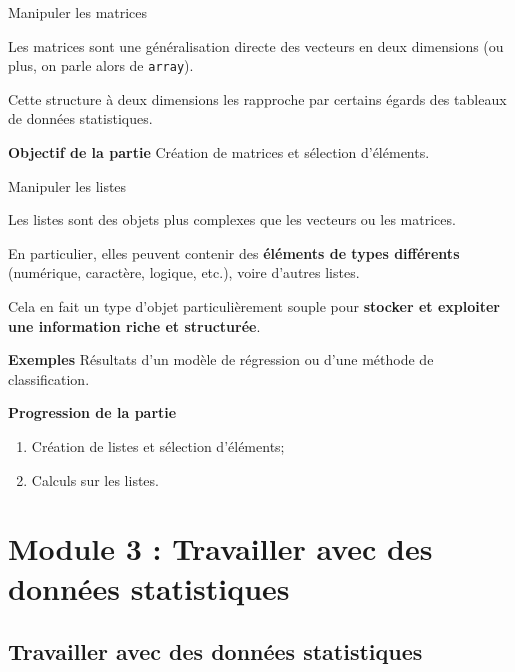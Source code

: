 \documentclass[12pt,ignorenonframetext,]{beamer}
\providecommand{\tightlist}{%
  \setlength{\itemsep}{0pt}\setlength{\parskip}{0pt}}
\newcommand{\aparte}[2]{
	{\small\textsf{\textcolor{redInsee}{\textbf{#1}} #2}}
}
\newcommand{\strong}[1]{\textbf{\textcolor{redInsee}{#1}}}
\begin{document}
\begin{frame}[fragile]{Manipuler les matrices}
\protect\hypertarget{manipuler-les-matrices}{}

Les matrices sont une généralisation directe des vecteurs en deux
dimensions (ou plus, on parle alors de \texttt{array}).

\pause Cette structure à deux dimensions les rapproche par certains
égards des tableaux de données statistiques.

\pause \bigskip \strong{Objectif de la partie} Création de matrices et
sélection d’éléments.

\end{frame}

\begin{frame}{Manipuler les listes}
\protect\hypertarget{manipuler-les-listes}{}

Les listes sont des objets plus complexes que les vecteurs ou les
matrices.

\pause En particulier, elles peuvent contenir des \textbf{éléments de
types différents} (numérique, caractère, logique, etc.), voire d’autres
listes.

\pause Cela en fait un type d’objet particulièrement souple pour
\textbf{stocker et exploiter une information riche et structurée}.

\aparte{Exemples}{Résultats d'un modèle de régression ou d'une méthode de classification.}

\pause \bigskip \strong{Progression de la partie}

\begin{enumerate}
[1.]
\tightlist
\item
  Création de listes et sélection d’éléments;
\item
  Calculs sur les listes.
\end{enumerate}

\end{frame}

\hypertarget{module-3-travailler-avec-des-donnees-statistiques}{%
\section{Module 3 : Travailler avec des données
statistiques}\label{module-3-travailler-avec-des-donnees-statistiques}}

\hypertarget{travailler-avec-des-donnees-statistiques}{%
\subsection*{Travailler avec des données
statistiques}\label{travailler-avec-des-donnees-statistiques}}
\end{document}
